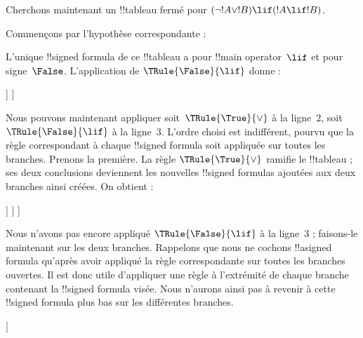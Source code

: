 \documentclass[11pt,a4paper,openany]{memoir}
\begin{document}
\begin{ex}
Cherchons maintenant un !!{tableau} fermé pour
$(\lnot !A \lor !B) \lif (!A \lif !B)$.

Commençons par l'hypothèse correspondante :
\begin{oltableau}
  [\sFmla{\False}{(\lnot \formula{A} \lor \formula{B}) \lif
      (\formula{A} \lif \formula{B})}, just=\TAss]
\end{oltableau}
L'unique !!{signed formula} de ce !!{tableau} a pour
!!{main operator}~$\lif$ et pour signe~$\False$. L'application de
$\TRule{\False}{\lif}$ donne :
\begin{oltableau}
  [\sFmla{\False}{(\lnot \formula{A} \lor \formula{B})
      \lif (\formula{A} \lif \formula{B})}, just=\TAss, checked
    [\sFmla{\True}{\lnot \formula{A} \lor \formula{B}},
      just={\TRule{\False}{\lif}[1]}
      [\sFmla{\False}{(\formula{A} \lif \formula{B})},
        just={\TRule{\False}{\lif}[1]}
      ]
    ]
  ]
\end{oltableau}
Nous pouvons maintenant appliquer soit~$\TRule{\True}{\lor}$ à la
ligne~$2$, soit $\TRule{\False}{\lif}$ à la ligne~$3$. L'ordre choisi
est indifférent, pourvu que la règle correspondant à chaque
!!{signed formula} soit appliquée sur toutes les branches. Prenons la
première. La règle $\TRule{\True}{\lor}$ ramifie le !!{tableau} ; ses
deux conclusions deviennent les nouvelles !!{signed formula}s ajoutées
aux deux branches ainsi créées. On obtient :
\begin{oltableau}
  [\sFmla{\False}{(\lnot \formula{A} \lor \formula{B}) \lif
      (\formula{A} \lif \formula{B})}, just=\TAss, checked
    [\sFmla{\True}{\lnot \formula{A} \lor \formula{B}},
      just={\TRule{\False}{\lif}[1]}, checked
      [\sFmla{\False}{(\formula{A} \lif \formula{B})},
        just={\TRule{\False}{\lif}[1]}
        [\sFmla{\True}{\lnot \formula{A}}, just={\TRule{\True}{\lor}[2]}]
        [\sFmla{\True}{\formula{B}}, just={\TRule{\True}{\lor}[2]}]
      ]
    ]
  ]
\end{oltableau}
Nous n'avons pas encore appliqué $\TRule{\False}{\lif}$ à la ligne~$3$ ;
faisons-le maintenant sur les deux branches. Rappelons que nous ne
cochons !!a{signed formula} qu'après avoir appliqué la règle
correspondante sur toutes les branches ouvertes. Il est donc utile
d'appliquer une règle à l'extrémité de chaque branche contenant la
!!{signed formula} visée. Nous n'aurons ainsi pas à revenir à cette
!!{signed formula} plus bas sur les différentes branches.
\begin{oltableau}
  [
\end{oltableau}
\end{ex}
\end{document}
